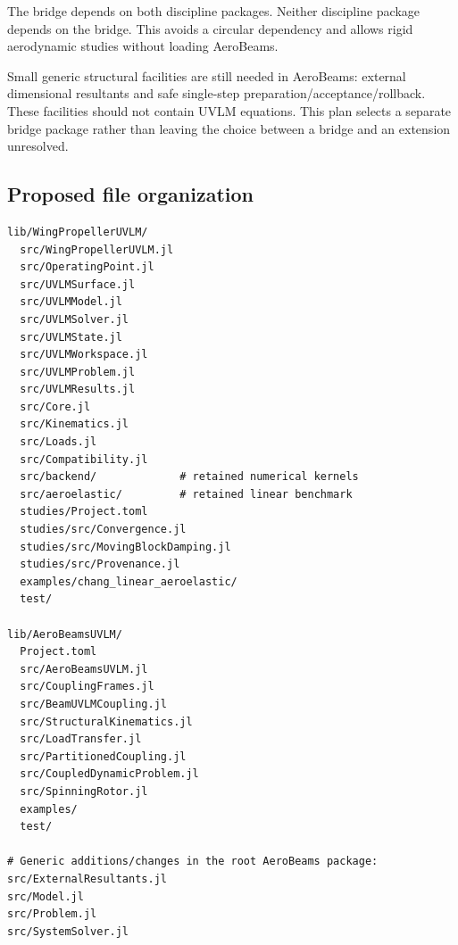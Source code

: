 \documentclass[11pt,a4paper]{article}
\begin{document}
\begin{center}
\setlength{\fboxsep}{8pt}
\end{center}

The bridge depends on both discipline packages. Neither discipline package
depends on the bridge. This avoids a circular dependency and allows rigid
aerodynamic studies without loading AeroBeams.

Small generic structural facilities are still needed in AeroBeams: external
dimensional resultants and safe single-step preparation/acceptance/rollback.
These facilities should not contain UVLM equations. This plan selects a
separate bridge package rather than leaving the choice between a bridge and
an extension unresolved.

\subsection{Proposed file organization}

\begin{lstlisting}
lib/WingPropellerUVLM/
  src/WingPropellerUVLM.jl
  src/OperatingPoint.jl
  src/UVLMSurface.jl
  src/UVLMModel.jl
  src/UVLMSolver.jl
  src/UVLMState.jl
  src/UVLMWorkspace.jl
  src/UVLMProblem.jl
  src/UVLMResults.jl
  src/Core.jl
  src/Kinematics.jl
  src/Loads.jl
  src/Compatibility.jl
  src/backend/             # retained numerical kernels
  src/aeroelastic/         # retained linear benchmark
  studies/Project.toml
  studies/src/Convergence.jl
  studies/src/MovingBlockDamping.jl
  studies/src/Provenance.jl
  examples/chang_linear_aeroelastic/
  test/

lib/AeroBeamsUVLM/
  Project.toml
  src/AeroBeamsUVLM.jl
  src/CouplingFrames.jl
  src/BeamUVLMCoupling.jl
  src/StructuralKinematics.jl
  src/LoadTransfer.jl
  src/PartitionedCoupling.jl
  src/CoupledDynamicProblem.jl
  src/SpinningRotor.jl
  examples/
  test/

# Generic additions/changes in the root AeroBeams package:
src/ExternalResultants.jl
src/Model.jl
src/Problem.jl
src/SystemSolver.jl
\end{lstlisting}
\end{document}
